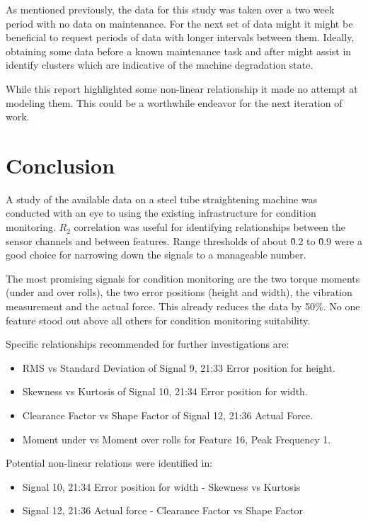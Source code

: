 \documentclass[]{article}
\begin{document}
As mentioned previously, the data for this study was taken over a two week period with no data on maintenance. For the next set of data might it might be beneficial to request periods of data with longer intervals between them. Ideally, obtaining some data before a known maintenance task and after might assist in identify clusters which are indicative of the machine degradation state.

While this report highlighted some non-linear relationship it made no attempt at modeling them. This could be a worthwhile endeavor for the next iteration of work.
\clearpage

\section{Conclusion}
A study of the available data on a steel tube straightening machine was conducted with an eye to using the existing infrastructure for condition monitoring. $R_2$ correlation was useful for identifying relationships between the sensor channels and between features. Range thresholds of about \~0.2 to \~0.9 were a good choice for narrowing down the signals to a manageable number.

The most promising signals for condition monitoring are the two torque moments (under and over rolls), the two error positions (height and width), the vibration measurement and the actual force. This already reduces the data by 50\%. No one feature stood out above all others for condition monitoring suitability.

Specific relationships recommended for further investigations are:
\begin{itemize}
\item \gls{RMS} vs Standard Deviation of Signal 9, 21:33 Error position for height.
\item Skewness vs Kurtosis of Signal 10, 21:34 Error position for width.
\item Clearance Factor vs Shape Factor of Signal 12, 21:36 Actual Force.
\item Moment under vs Moment over rolls for Feature 16, Peak Frequency 1.
\end{itemize}

Potential non-linear relations were identified in:
\begin{itemize}
\item Signal 10, 21:34 Error position for width - Skewness vs Kurtosis
\item Signal 12, 21:36 Actual force - Clearance Factor vs Shape Factor
\end{itemize}
\newpage
\end{document}
